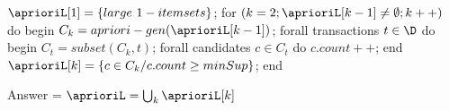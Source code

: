 $\aprioriL[1] = \left\{large\ 1-itemsets\right\}$;
for $(k=2; \aprioriL[k-1]\neq\emptyset;k++)$ do begin
	$C_k = apriori-gen(\aprioriL[k-1])$;
	forall transactions $t \in \D$ do begin
		$C_t = subset(C_k, t)$;
		forall candidates $c \in C_t$ do
			$c.count++$;
	end
	$\aprioriL[k] = \left\{c \in C_k / c.count \geq minSup\right\}$;
end

Answer = $\aprioriL = \bigcup_k{\aprioriL[k]}$